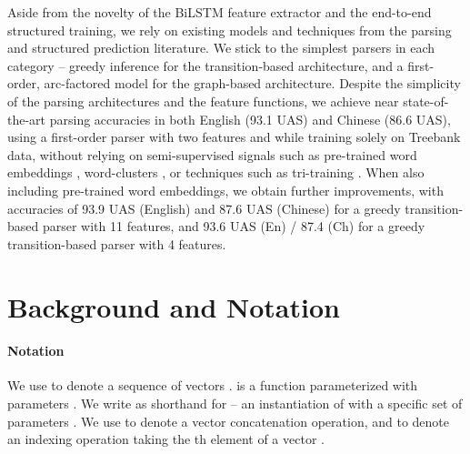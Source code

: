 \documentclass[11pt]{article}
\begin{document}
Aside from the novelty of the BiLSTM feature extractor and the end-to-end
structured training, we rely on existing models and techniques from
the parsing and structured prediction literature.
We stick to the simplest
parsers in each category -- greedy inference for the transition-based
architecture, and a first-order, arc-factored model for the graph-based
architecture.
Despite the simplicity of the parsing architectures and the
feature functions, we achieve near state-of-the-art parsing accuracies in both English
(93.1 UAS) and
Chinese (86.6 UAS), using a first-order parser with two features and while
training solely on Treebank data, without relying on semi-supervised signals such as pre-trained word
embeddings \cite{chen2014fast}, word-clusters \cite{koo2008semisup}, or
techniques such as tri-training \cite{weiss2015structured}.  When also including
pre-trained word embeddings, we obtain further improvements, with accuracies of
93.9 UAS (English) and 87.6 UAS (Chinese) for a greedy transition-based parser
with 11 features, and 93.6 UAS (En) / 87.4 (Ch) for a greedy transition-based
parser with 4 features.

 
\section{Background and Notation}
\paragraph{Notation} We use  to denote a sequence of  vectors .
 is a function parameterized with parameters .
We write  as shorthand for  -- an instantiation of 
with a specific set of parameters .  We use  to denote a vector
concatenation operation, and  to denote an indexing operation taking the
th element of a vector .
\end{document}
